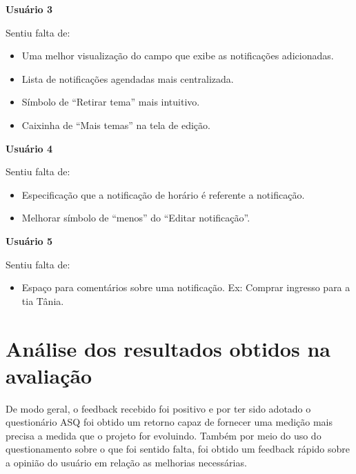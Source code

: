 	\textbf{Usuário 3}
	
	Sentiu falta de:
	
	\begin{itemize}
       \item Uma melhor visualização do campo que exibe as notificações adicionadas.

       \item Lista de notificações agendadas mais centralizada.
       
       \item Símbolo de “Retirar tema” mais intuitivo.

       \item Caixinha de “Mais temas” na tela de edição.
       
        \end{itemize}
	
	\textbf{Usuário 4}
	
	Sentiu falta de:
	
	\begin{itemize}
       \item Especificação que a notificação de horário é referente a notificação.

       \item Melhorar símbolo de “menos” do “Editar notificação”.
       
        \end{itemize}
	
	\textbf{Usuário 5}
	
	Sentiu falta de:
	
	\begin{itemize}
       \item Espaço para comentários sobre uma notificação. Ex: Comprar ingresso para a tia Tânia.
       
        \end{itemize}
  
        \section{Análise dos resultados obtidos na avaliação}
        
        De modo geral, o feedback recebido foi positivo e por ter sido adotado o questionário ASQ foi obtido um retorno capaz de fornecer 
        uma medição mais precisa a medida que o projeto for evoluindo. Também por meio do uso do questionamento sobre o que foi sentido falta, 
        foi obtido um feedback rápido sobre a opinião do usuário em relação as melhorias necessárias.
  